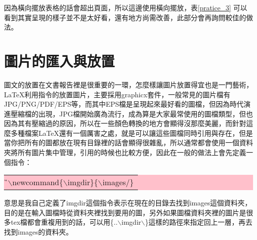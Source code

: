 \begin{enumerate}
因為橫向擺放表格的話會超出頁面，所以這邊使用橫向擺放，表\ref{pratice_3} 可以看到其實呈現的樣子並不是太好看，還有地方尚需改善，此部分會再詢問較佳的做法。
\newpage
\begin{table}[H] 
	\centering 
	\caption{Coefficients}\label{pratice_3}
\end{table}

\end{enumerate}

\newpage
\section{{\CB 圖片的匯入與放置}}
圖文的放置在文書報告裡是很重要的一環，怎麼樣讓圖片放置得宜也是一門藝術，\LaTeX 利用指令的放置圖片，主要採用graphicx套件，一般常見的圖片檔有JPG/PNG/PDF/EPS等，而其中EPS檔是呈現起來最好看的圖檔，但因為時代演進壓縮檔的出現，JPG檔開始廣為流行，成為算是大家最常使用的圖檔類型，但也因為其有壓縮過的原因，所以在一些顏色轉換的地方會顯得沒那麼美麗，而針對這麼多種檔案\LaTeX 還有一個厲害之處，就是可以讓這些圖檔同時引用與存在，但是當你把所有的圖都放在現有目錄裡的話會顯得很雜亂，所以通常都會使用一個資料夾將所有圖片集中管理，引用的時候也比較方便，因此在一般的做法上會先定義一個指令：
\begin{center}
	\colorbox{pink}{\begin{tabular}{p{}}
	{\G $\backslash$newcommand$\lbrace\backslash$imgdir$\rbrace\lbrace\backslash$images/$\rbrace$}
\end{tabular}}
\end{center}
意思是我自己定義了imgdir這個指令表示在現在的目錄去找到images這個資料夾，目的是在輸入圖檔時從資料夾裡找到要用的圖，另外如果圖檔資料夾裡的圖片是很多tex檔都會重複用到的話，可以用\{..$\backslash$imgdir$\backslash$\}這樣的路徑來指定回上一層，再去找到images的資料夾。


